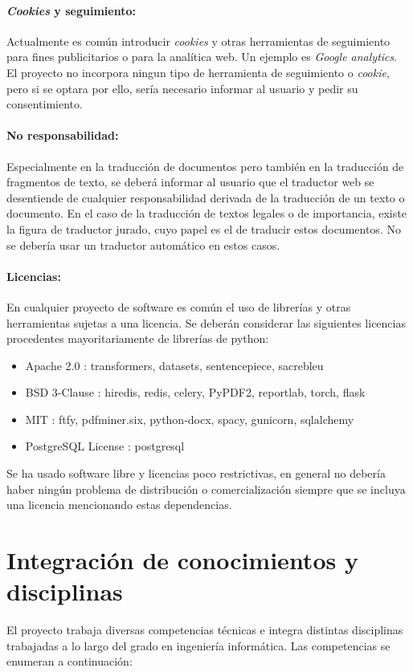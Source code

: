 \paragraph{\textit{Cookies} y seguimiento:}
Actualmente es común introducir \textit{cookies} y otras herramientas de seguimiento para fines publicitarios o para la analítica web. Un ejemplo es \textit{Google analytics}. El proyecto no incorpora ningun tipo de herramienta de seguimiento o \textit{cookie}, pero si se optara por ello, sería necesario informar al usuario y pedir su consentimiento.

\paragraph{No responsabilidad:}
Especialmente en la traducción de documentos pero también en la traducción de fragmentos de texto, se deberá informar al usuario que el traductor web se desentiende de cualquier responsabilidad derivada de la traducción de un texto o documento. En el caso de la traducción de textos legales o de importancia, existe la figura de traductor jurado, cuyo papel es el de traducir estos documentos. No se debería usar un traductor automático en estos casos.

\paragraph{Licencias:}
En cualquier proyecto de software es común el uso de librerías y otras herramientas sujetas a una licencia. Se deberán considerar las siguientes licencias procedentes mayoritariamente de librerías de python:
\begin{itemize}
    \item Apache 2.0 \cite{Apache2license}: transformers, datasets, sentencepiece, sacrebleu
    \item BSD 3-Clause \cite{BSD3Clause}: hiredis, redis, celery, PyPDF2, reportlab, torch, flask
    \item MIT \cite{MITLicense}: ftfy, pdfminer.six, python-docx, spacy, gunicorn, sqlalchemy
    \item PostgreSQL License \cite{Postgreslicense}: postgresql
\end{itemize}
Se ha usado software libre y licencias poco restrictivas, en general no debería haber ningún problema de distribución o comercialización siempre que se incluya una licencia mencionando estas dependencias.

\section{Integración de conocimientos y disciplinas}
El proyecto trabaja diversas competencias técnicas e integra distintas disciplinas trabajadas a lo largo del grado en ingeniería informática. Las competencias se enumeran a continuación:

